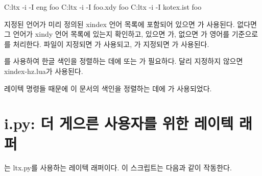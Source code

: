 \begin{code}
C:\>ltx -i -I eng foo
C:\>ltx -i -I foo.xdy foo
C:\>ltx -i -I kotex.ist foo
\end{code}

지정된 언어가 미리 정의된 xindex 언어 목록에 포함되어 있으면 가 사용된다.
없다면 그 언어가 xindy 언어 목록에 있는지 확인하고, 있으면 가, 없으면 가 영어를 기준으로 를 처리한다.
 파일이 지정되면 가 사용되고, 가 지정되면 가 사용된다.

\begin{note}
를 사용하여 한글 색인을 정렬하는 데에  또는 가 필요하다. 달리 지정하지 않으면 xindex-hz.lua가 사용된다.
\end{note}

\begin{note}
레이텍 명령들 때문에 이 문서의 색인을 정렬하는 데에 가 사용되었다.
\end{note}

\section{i.py: 더 게으른 사용자를 위한 레이텍 래퍼}

는 ltx.py를 사용하는 레이텍 래퍼이다. 이 스크립트는 다음과 같이 작동한다.

